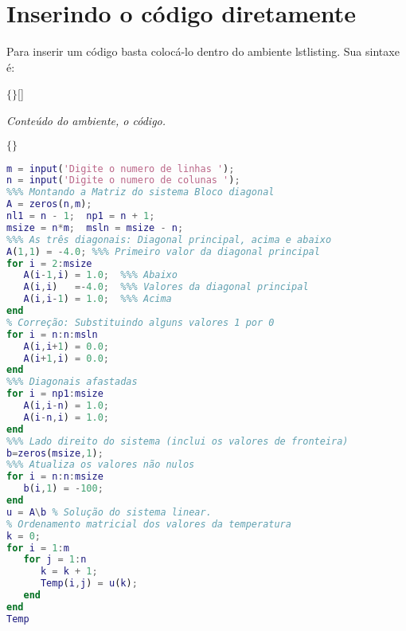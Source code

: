 \section{Inserindo o código diretamente}

Para inserir um código basta colocá-lo dentro do ambiente \textsf{lstlisting}. Sua sintaxe é:
\begin{center}
	\begin{minipage}{0.7\textwidth}
		$\{$$\}$[]
		
		\vspace{0.2cm}
		\hspace{0.5cm}\textit{Conteúdo do ambiente, o código.}
		\vspace{0.2cm}
		
		$\{$\textsf{}$\}$
	\end{minipage}
\end{center}

\begin{tcolorbox}[breakable,title={Código posto dentro de um ambiente lstlisting}]
\begin{lstlisting}[language=Matlab,
caption={Exemplo de inclusão de código},captionpos=b]
m = input('Digite o numero de linhas ');
n = input('Digite o numero de colunas ');
%%% Montando a Matriz do sistema Bloco diagonal
A = zeros(n,m);
nl1 = n - 1;  np1 = n + 1;
msize = n*m;  msln = msize - n;
%%% As três diagonais: Diagonal principal, acima e abaixo
A(1,1) = -4.0; %%% Primeiro valor da diagonal principal
for i = 2:msize
   A(i-1,i) = 1.0;  %%% Abaixo
   A(i,i)   =-4.0;  %%% Valores da diagonal principal
   A(i,i-1) = 1.0;  %%% Acima
end
% Correção: Substituindo alguns valores 1 por 0
for i = n:n:msln
   A(i,i+1) = 0.0;
   A(i+1,i) = 0.0;
end
%%% Diagonais afastadas
for i = np1:msize
   A(i,i-n) = 1.0;
   A(i-n,i) = 1.0;
end
%%% Lado direito do sistema (inclui os valores de fronteira)
b=zeros(msize,1);
%%% Atualiza os valores não nulos
for i = n:n:msize
   b(i,1) = -100;
end
u = A\b % Solução do sistema linear.
% Ordenamento matricial dos valores da temperatura
k = 0;
for i = 1:m
   for j = 1:n
      k = k + 1;
      Temp(i,j) = u(k);
   end
end
Temp
\end{lstlisting}

\end{tcolorbox}




